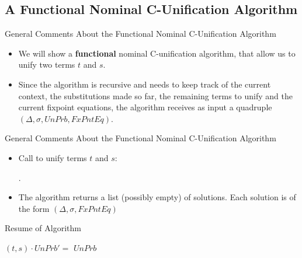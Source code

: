 \subsection{A Functional Nominal C-Unification Algorithm}

\begin{frame}{General Comments About the Functional Nominal C-Unification Algorithm}
\begin{itemize}
    \item We will show a \textbf{functional} nominal C-unification algorithm, that allow us to
    unify two terms $t$ and $s$.
    \item Since the algorithm is recursive and needs to keep track of the current context,
        the substitutions made so far, the remaining terms to unify and the current
        fixpoint equations, the algorithm receives as input a quadruple 
        $(\Delta, \sigma, UnPrb, FxPntEq)$.
\end{itemize}
\end{frame}

\begin{frame}{General Comments About the Functional Nominal C-Unification Algorithm}
\begin{itemize}
    \item Call to unify terms $t$ and $s$: 
    \begin{algorithmic}[1]
        .
    \end{algorithmic}
    \item The algorithm returns a list (possibly empty) of solutions. Each solution
        is of the form $(\Delta, \sigma, FxPntEq)$
\end{itemize}
\end{frame}

\begin{frame}[allowframebreaks]{Resume of Algorithm}
\begin{algorithmic}[1]
        \State {} 
    \Else 
        \State $(t, s) \cdot UnPrb' =$ $UnPrb$
    \EndIf
\EndProcedure
\end{algorithmic}
\end{frame}

